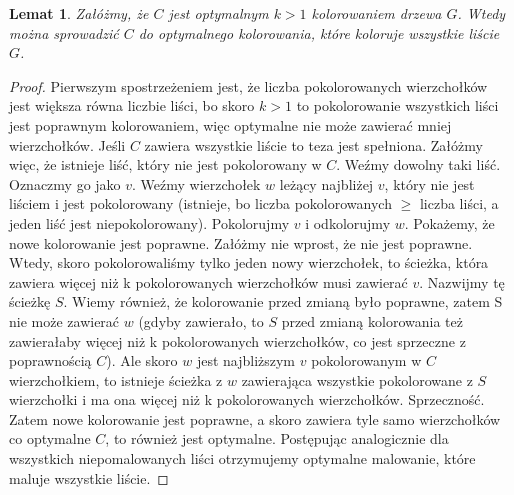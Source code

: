 \documentclass{article}
\newtheorem{lemat}{Lemat}
\begin{document}
\begin{lemat}
Załóżmy, że $C$ jest optymalnym $k>1$ kolorowaniem drzewa $G$. Wtedy można sprowadzić $C$ do optymalnego kolorowania, które koloruje wszystkie liście $G$.
\end{lemat}
\begin{proof}
Pierwszym spostrzeżeniem jest, że liczba pokolorowanych wierzchołków jest większa równa liczbie liści, bo skoro $k>1$ to pokolorowanie wszystkich liści jest poprawnym kolorowaniem, więc optymalne nie może zawierać mniej wierzchołków. Jeśli $C$ zawiera wszystkie liście to teza jest spełniona. Załóżmy więc, że istnieje liść, który nie jest pokolorowany w $C$. Weźmy dowolny taki liść. Oznaczmy go jako $v$. Weźmy wierzchołek $w$ leżący najbliżej $v$, który nie jest liściem i jest pokolorowany (istnieje, bo liczba pokolorowanych $\geq$ liczba liści, a jeden liść jest niepokolorowany). Pokolorujmy $v$ i odkolorujmy $w$. Pokażemy, że nowe kolorowanie jest poprawne. Załóżmy nie wprost, że nie jest poprawne. Wtedy, skoro pokolorowaliśmy tylko jeden nowy wierzchołek, to ścieżka, która zawiera więcej niż k pokolorowanych wierzchołków musi zawierać $v$. Nazwijmy tę ścieżkę $S$. Wiemy również, że kolorowanie przed zmianą było poprawne, zatem S nie może zawierać $w$ (gdyby zawierało, to $S$ przed zmianą kolorowania też zawierałaby więcej niż k pokolorowanych wierzchołków, co jest sprzeczne z poprawnością $C$). Ale skoro $w$ jest najbliższym $v$ pokolorowanym w $C$ wierzchołkiem, to istnieje ścieżka z $w$ zawierająca wszystkie pokolorowane z $S$ wierzchołki i ma ona więcej niż k pokolorowanych wierzchołków. Sprzeczność. Zatem nowe kolorowanie jest poprawne, a skoro zawiera tyle samo wierzchołków co optymalne $C$, to również jest optymalne. Postępując analogicznie dla wszystkich niepomalowanych liści otrzymujemy optymalne malowanie, które maluje wszystkie liście.
\end{proof}
\end{document}
